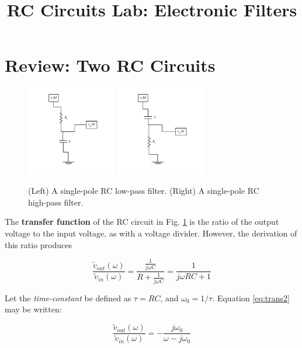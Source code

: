 \documentclass[12pt]{article}
\title{RC Circuits Lab: Electronic Filters}
\begin{document}
\maketitle

\section{Review: Two RC Circuits}

\begin{figure}
\centering
\includegraphics[width=0.35\textwidth,trim=0cm 1cm 0cm 0cm,clip=true]{LowPass.pdf}
\includegraphics[width=0.35\textwidth,trim=0cm 1cm 0cm 0cm,clip=true]{HighPass.pdf}
\caption{\label{fig:fig2} (Left) A single-pole RC low-pass filter. (Right) A single-pole RC high-pass filter.}
\end{figure}

The \textbf{transfer function} of the RC circuit in Fig. \ref{fig:fig2} is the ratio of the output voltage to the input voltage, as with a voltage divider.  However, the derivation of this ratio produces

\begin{equation}
\frac{\tilde{v}_{out}(\omega)}{\tilde{v}_{in}(\omega)} = \frac{\frac{1}{j\omega C}}{R+\frac{1}{j\omega C}} = \frac{1}{j\omega R C + 1}
\label{eq:trans2}
\end{equation}

Let the \textit{time-constant} be defined as $\tau = RC$, and $\omega_0 = 1/\tau$.  Equation \ref{eq:trans2} may be written:

\begin{equation}
\frac{\tilde{v}_{out}(\omega)}{\tilde{v}_{in}(\omega)} = -\frac{j\omega_0}{\omega - j\omega_0}
\label{eq:eq6}
\end{equation}
\end{document}
